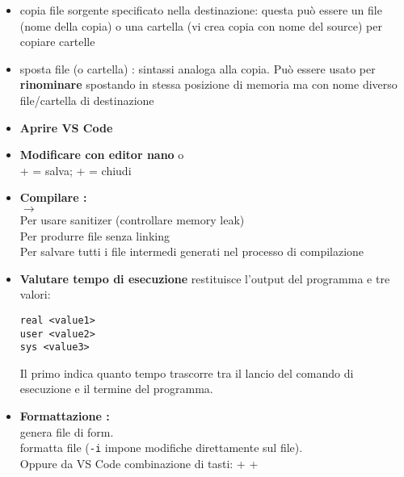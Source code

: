 \documentclass[10pt, oneside]{Book}
\begin{document}
\begin{itemize}
\item {} copia file sorgente specificato nella destinazione: questa può essere un file (nome della copia) o una cartella (vi crea copia con nome del source)  per copiare cartelle

\item {} sposta file (o cartella) : sintassi analoga alla copia. Può essere usato per \textbf{rinominare} spostando in stessa posizione di memoria ma con nome diverso file/cartella di destinazione

\item \textbf{Aprire VS Code} 

\item \textbf{Modificare con editor nano}  o 
\\ +  = salva;  +  = chiudi

\item \textbf{Compilare : } 
\\ $\rightarrow$ 
\\Per usare sanitizer (controllare memory leak) 
\\Per produrre file senza linking 
\\Per salvare tutti i file intermedi generati nel processo di compilazione 

\item \textbf{Valutare tempo di esecuzione}  restituisce l'output del programma e tre valori:
\begin{verbatim}
real <value1>
user <value2>
sys <value3>
\end{verbatim}
Il primo indica quanto tempo trascorre tra il lancio del comando di esecuzione e il termine del programma.

\item \textbf{Formattazione : }
\\ genera file di form.
\\ formatta file (\texttt{-i} impone modifiche direttamente sul file). 
\\Oppure da VS Code combinazione di tasti:  + \boxed{\texttt{$\uparrow$ \quad}} +  


\end{itemize}
\end{document}
